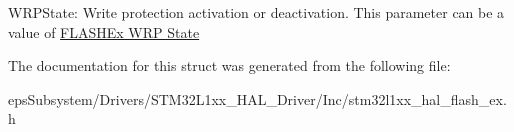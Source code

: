 W\-R\-P\-State\-: Write protection activation or deactivation. This parameter can be a value of \hyperlink{group___f_l_a_s_h_ex___w_r_p___state}{F\-L\-A\-S\-H\-Ex W\-R\-P State} 

The documentation for this struct was generated from the following file\-:\begin{DoxyCompactItemize}
\item 
eps\-Subsystem/\-Drivers/\-S\-T\-M32\-L1xx\-\_\-\-H\-A\-L\-\_\-\-Driver/\-Inc/stm32l1xx\-\_\-hal\-\_\-flash\-\_\-ex.\-h\end{DoxyCompactItemize}
